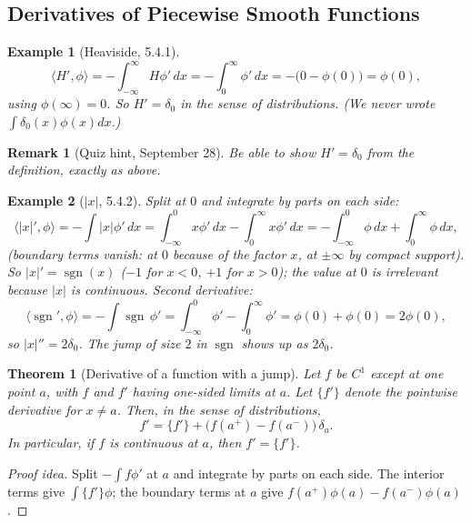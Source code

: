 \documentclass{article}
\newtheorem{theorem}{Theorem}
\newtheorem*{example}{Example}
\newtheorem{remark}{Remark}
\newcommand{\ip}[2]{\langle #1, #2 \rangle}
\begin{document}
\subsection{Derivatives of Piecewise Smooth Functions}
\begin{example}[Heaviside, 5.4.1]
    \begin{equation}
        \ip{H'}{\phi} = -\int_{-\infty}^\infty H\phi'\,dx = -\int_0^\infty \phi'\,dx = -\big(0 - \phi(0)\big) = \phi(0),
    \end{equation}
    using $\phi(\infty) = 0$. So $H' = \delta_0$ in the sense of distributions. (We never wrote $\int\delta_0(x)\phi(x)dx$.)
\end{example}
\begin{remark}[Quiz hint, September 28]
    Be able to show $H' = \delta_0$ from the definition, exactly as above.
\end{remark}
\begin{example}[$|x|$, 5.4.2]
    Split at $0$ and integrate by parts on each side:
    \begin{equation}
        \ip{|x|'}{\phi} = -\int |x|\phi'\,dx = \int_{-\infty}^0 x\phi'\,dx - \int_0^\infty x\phi'\,dx = -\int_{-\infty}^0\phi\,dx + \int_0^\infty\phi\,dx,
    \end{equation}
    (boundary terms vanish: at $0$ because of the factor $x$, at $\pm\infty$ by compact support). So $|x|' = \operatorname{sgn}(x)$ ($-1$ for $x<0$, $+1$ for $x>0$); the value at $0$ is irrelevant because $|x|$ is continuous. Second derivative:
    \begin{equation}
        \ip{\operatorname{sgn}'}{\phi} = -\int\operatorname{sgn}\,\phi' = \int_{-\infty}^0\phi' - \int_0^\infty\phi' = \phi(0) + \phi(0) = 2\phi(0),
    \end{equation}
    so $|x|'' = 2\delta_0$. The jump of size $2$ in $\operatorname{sgn}$ shows up as $2\delta_0$.
\end{example}
\begin{theorem}[Derivative of a function with a jump]
    Let $f$ be $C^1$ except at one point $a$, with $f$ and $f'$ having one-sided limits at $a$. Let $\{f'\}$ denote the pointwise derivative for $x \neq a$. Then, in the sense of distributions,
    \begin{equation}
        f' = \{f'\} + \big(f(a^+) - f(a^-)\big)\,\delta_a.
    \end{equation}
    In particular, if $f$ is continuous at $a$, then $f' = \{f'\}$.
\end{theorem}
\begin{proof}[Proof idea]
    Split $-\int f\phi'$ at $a$ and integrate by parts on each side. The interior terms give $\int\{f'\}\phi$; the boundary terms at $a$ give $f(a^+)\phi(a) - f(a^-)\phi(a)$.
\end{proof}
\end{document}
